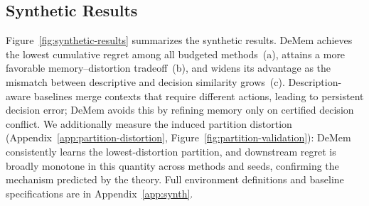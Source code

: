 \documentclass{article}
\theoremstyle{plain}
\theoremstyle{definition}
\theoremstyle{remark}
\begin{document}
\vspace{-0.3em}
\subsection{Synthetic Results}
\label{sec:synthetic}
\vspace{-0.3em}


Figure~\ref{fig:synthetic-results} summarizes the synthetic results.
DeMem achieves the lowest cumulative regret among all budgeted methods~(a), attains a more favorable memory--distortion tradeoff~(b), and widens its advantage as the mismatch between descriptive and decision similarity grows~(c).
Description-aware baselines merge contexts that require different actions, leading to persistent decision error; DeMem avoids this by refining memory only on certified decision conflict.
We additionally measure the induced partition distortion (Appendix~\ref{app:partition-distortion}, Figure~\ref{fig:partition-validation}): DeMem consistently learns the lowest-distortion partition, and downstream regret is broadly monotone in this quantity across methods and seeds, confirming the mechanism predicted by the theory.
Full environment definitions and baseline specifications are in Appendix~\ref{app:synth}.
\end{document}

